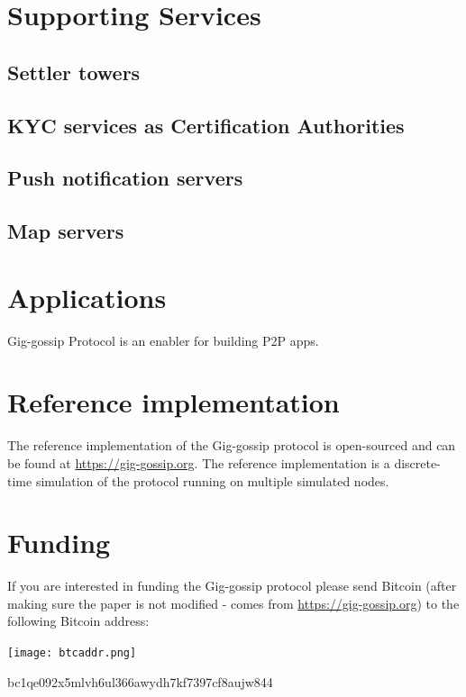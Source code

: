 \documentclass{article}
\begin{document}
\section{Supporting Services}

\subsection{Settler towers}

\subsection{KYC services as Certification Authorities}

\subsection{Push notification servers}

\subsection{Map servers}

\section{Applications}

Gig-gossip Protocol is an enabler for building P2P apps.

\section{Reference implementation}
The reference implementation of the Gig-gossip protocol is open-sourced and can be found at \url{https://gig-gossip.org}. The reference implementation is a discrete-time simulation of the protocol running on multiple simulated nodes.

\section{Funding}
If you are interested in funding the Gig-gossip protocol please send Bitcoin (after making sure the paper is not modified - comes from \url{https://gig-gossip.org}) to the following Bitcoin address:

\texttt{[image: btcaddr.png]}

bc1qe092x5mlvh6ul366awydh7kf7397cf8aujw844
\end{document}
